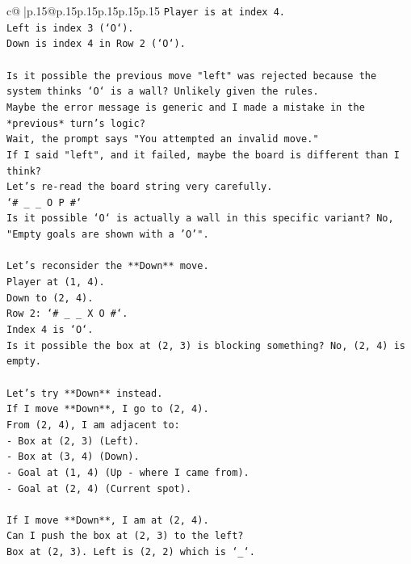 \documentclass{article}
\begin{document}
{\begin{supertabular}{c@{$\;$}|p{.15\linewidth}@{}p{.15\linewidth}p{.15\linewidth}p{.15\linewidth}p{.15\linewidth}p{.15\linewidth}}
{{{\texttt{Player is at index 4.} \\
\texttt{Left is index 3 (`O`).} \\
\texttt{Down is index 4 in Row 2 (`O`).} \\
\\ 
\texttt{Is it possible the previous move "left" was rejected because the system thinks `O` is a wall? Unlikely given the rules.} \\
\texttt{Maybe the error message is generic and I made a mistake in the *previous* turn's logic?} \\
\texttt{Wait, the prompt says "You attempted an invalid move."} \\
\texttt{If I said "left", and it failed, maybe the board is different than I think?} \\
\texttt{Let's re{-}read the board string very carefully.} \\
\texttt{`\# \_ \_ O P \#`} \\
\texttt{Is it possible `O` is actually a wall in this specific variant? No, "Empty goals are shown with a 'O'".} \\
\\ 
\texttt{Let's reconsider the **Down** move.} \\
\texttt{Player at (1, 4).} \\
\texttt{Down to (2, 4).} \\
\texttt{Row 2: `\# \_ \_ X O \#`.} \\
\texttt{Index 4 is `O`.} \\
\texttt{Is it possible the box at (2, 3) is blocking something? No, (2, 4) is empty.} \\
\\ 
\texttt{Let's try **Down** instead.} \\
\texttt{If I move **Down**, I go to (2, 4).} \\
\texttt{From (2, 4), I am adjacent to:} \\
\texttt{{-} Box at (2, 3) (Left).} \\
\texttt{{-} Box at (3, 4) (Down).} \\
\texttt{{-} Goal at (1, 4) (Up {-} where I came from).} \\
\texttt{{-} Goal at (2, 4) (Current spot).} \\
\\ 
\texttt{If I move **Down**, I am at (2, 4).} \\
\texttt{Can I push the box at (2, 3) to the left?} \\
\texttt{Box at (2, 3). Left is (2, 2) which is `\_`.} \\
}}}
\end{supertabular}}
\end{document}
